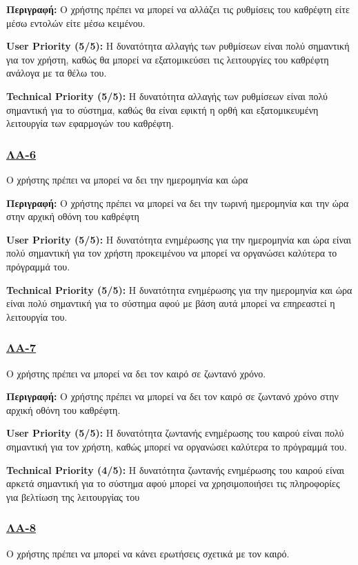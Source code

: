 \noindent\textbf{Περιγραφή:} Ο χρήστης πρέπει να μπορεί να αλλάζει τις ρυθμίσεις του καθρέφτη είτε μέσω εντολών είτε μέσω κειμένου.

\noindent\textbf{User Priority (5/5):} Η δυνατότητα αλλαγής των ρυθμίσεων είναι πολύ σημαντική για τον χρήστη, καθώς θα μπορεί να εξατομικεύσει τις λειτουργίες του καθρέφτη ανάλογα με τα θέλω του.

\noindent\textbf{Technical Priority (5/5):} Η δυνατότητα αλλαγής των ρυθμίσεων είναι πολύ σημαντική για το σύστημα, καθώς θα είναι εφικτή η ορθή και εξατομικευμένη λειτουργία των εφαρμογών του καθρέφτη.

\subsubsection{\underline{ΛΑ-6}}
\noindent Ο χρήστης πρέπει να μπορεί να δει την ημερομηνία και ώρα

\noindent\textbf{Περιγραφή:} Ο χρήστης πρέπει να μπορεί να δει την τωρινή ημερομηνία και την ώρα στην αρχική οθόνη του καθρέφτη

\noindent\textbf{User Priority (5/5):} Η δυνατότητα ενημέρωσης για την ημερομηνία και ώρα είναι πολύ σημαντική για τον χρήστη προκειμένου να μπορεί να οργανώσει καλύτερα το πρόγραμμά του.

\noindent\textbf{Technical Priority (5/5):} Η δυνατότητα ενημέρωσης για την ημερομηνία και ώρα είναι πολύ σημαντική για το σύστημα αφού με βάση αυτά μπορεί να επηρεαστεί η λειτουργία του.

\subsubsection{\underline{ΛΑ-7}}
\noindent Ο χρήστης πρέπει να μπορεί να δει τον καιρό σε ζωντανό χρόνο.

\noindent\textbf{Περιγραφή:} Ο χρήστης πρέπει να μπορεί να δει τον καιρό σε ζωντανό χρόνο στην αρχική οθόνη του καθρέφτη.

\noindent\textbf{User Priority (5/5):} Η δυνατότητα ζωντανής ενημέρωσης του καιρού είναι πολύ σημαντική για τον χρήστη, καθώς μπορεί να οργανώσει καλύτερα το πρόγραμμά του.

\noindent\textbf{Technical Priority (4/5):} Η δυνατότητα ζωντανής ενημέρωσης του καιρού είναι αρκετά σημαντική για το σύστημα αφού μπορεί να χρησιμοποιήσει τις πληροφορίες για βελτίωση της λειτουργίας του

\subsubsection{\underline{ΛΑ-8}}
\noindent Ο χρήστης πρέπει να μπορεί να κάνει ερωτήσεις σχετικά με τον καιρό.

